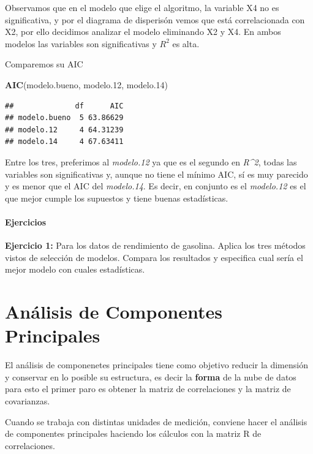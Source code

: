 \documentclass[
]{book}
\newenvironment{Shaded}{\begin{snugshade}}{\end{snugshade}}
\newcommand{\FloatTok}[1]{\textcolor[rgb]{0.00,0.00,0.81}{#1}}
\newcommand{\FunctionTok}[1]{\textcolor[rgb]{0.13,0.29,0.53}{\textbf{#1}}}
\newcommand{\NormalTok}[1]{#1}
\begin{document}
Observamos que en el modelo que elige el algoritmo, la variable X4 no es significativa, y por el diagrama de disperisón vemos que está correlacionada con X2, por ello decidimos analizar el modelo eliminando X2 y X4. En ambos modelos las variables son significativas y \(R^2\) es alta.

Comparemos su AIC

\begin{Shaded}
\begin{Highlighting}[]
\FunctionTok{AIC}\NormalTok{(modelo.bueno, modelo}\FloatTok{.12}\NormalTok{, modelo}\FloatTok{.14}\NormalTok{)}
\end{Highlighting}
\end{Shaded}

\begin{verbatim}
##              df      AIC
## modelo.bueno  5 63.86629
## modelo.12     4 64.31239
## modelo.14     4 67.63411
\end{verbatim}

Entre los tres, preferimos al \emph{modelo.12} ya que es el segundo en \emph{R\^{}2}, todas las variables son significativas y, aunque no tiene el mínimo AIC, sí es muy parecido y es menor que el AIC del \emph{modelo.14}. Es decir, en conjunto es el \emph{modelo.12} es el que mejor cumple los supuestos y tiene buenas estadísticas.

\subsubsection{Ejercicios}\label{ejercicios-4}

\textbf{Ejercicio 1:} Para los datos de rendimiento de gasolina. Aplica los tres métodos vistos de selección de modelos. Compara los resultados y especifica cual sería el mejor modelo con cuales estadísticas.

\chapter{Análisis de Componentes Principales}\label{anuxe1lisis-de-componentes-principales}

El análisis de componenetes principales tiene como objetivo reducir la dimensión y
conservar en lo posible su estructura, es decir la \textbf{forma} de la nube de datos para esto el primer paro es obtener la matriz de correlaciones y la matriz de covarianzas.

Cuando se trabaja con distintas unidades de medición, conviene hacer el análisis de componentes principales haciendo los cálculos con la matriz R de correlaciones.
\end{document}
